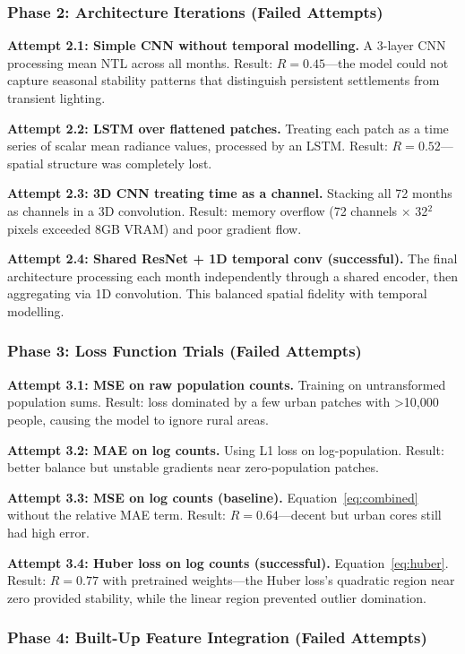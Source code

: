 \documentclass[12pt,a4paper]{article}
\begin{document}
\subsubsection{Phase 2: Architecture Iterations (Failed Attempts)}

\textbf{Attempt 2.1: Simple CNN without temporal modelling.} A 3-layer CNN processing mean NTL across all months. Result: $R = 0.45$---the model could not capture seasonal stability patterns that distinguish persistent settlements from transient lighting.

\textbf{Attempt 2.2: LSTM over flattened patches.} Treating each patch as a time series of scalar mean radiance values, processed by an LSTM. Result: $R = 0.52$---spatial structure was completely lost.

\textbf{Attempt 2.3: 3D CNN treating time as a channel.} Stacking all 72 months as channels in a 3D convolution. Result: memory overflow (72 channels $\times$ 32$^2$ pixels exceeded 8GB VRAM) and poor gradient flow.

\textbf{Attempt 2.4: Shared ResNet + 1D temporal conv (successful).} The final architecture processing each month independently through a shared encoder, then aggregating via 1D convolution. This balanced spatial fidelity with temporal modelling.

\subsubsection{Phase 3: Loss Function Trials (Failed Attempts)}

\textbf{Attempt 3.1: MSE on raw population counts.} Training on untransformed population sums. Result: loss dominated by a few urban patches with >10,000 people, causing the model to ignore rural areas.

\textbf{Attempt 3.2: MAE on log counts.} Using L1 loss on log-population. Result: better balance but unstable gradients near zero-population patches.

\textbf{Attempt 3.3: MSE on log counts (baseline).} Equation~\ref{eq:combined} without the relative MAE term. Result: $R = 0.64$---decent but urban cores still had high error.

\textbf{Attempt 3.4: Huber loss on log counts (successful).} Equation~\ref{eq:huber}. Result: $R = 0.77$ with pretrained weights---the Huber loss's quadratic region near zero provided stability, while the linear region prevented outlier domination.

\subsubsection{Phase 4: Built-Up Feature Integration (Failed Attempts)}
\end{document}
